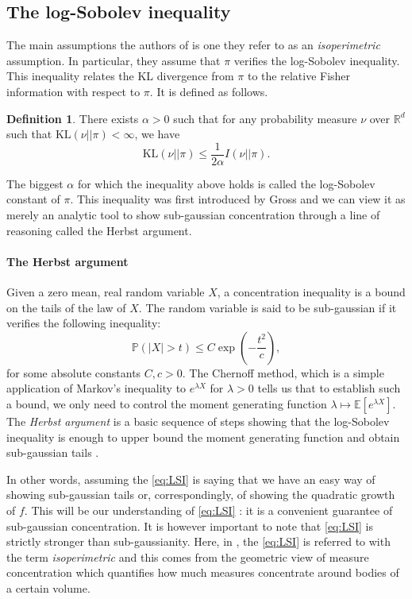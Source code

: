 \documentclass[10pt,journal,a4paper]{IEEEtran}
\theoremstyle{definition}
\newtheorem{definition}{Definition}[section]
\newcommand{\Prb}{\mathbb{P}}
\newcommand{\E}{\mathbb{E}}
\newcommand{\R}{\mathbb{R}}
\newcommand{\KL}{\text{KL}}
\begin{document}
\subsection{The log-Sobolev inequality}

The main assumptions the authors of \cite{vempala_rapid_2019} is one they refer to as an \textit{isoperimetric} assumption. In particular, they assume that $\pi$ verifies the log-Sobolev inequality. This inequality relates the KL divergence from $\pi$ to the relative Fisher information with respect to $\pi$. It is defined as follows.

\begin{definition}
  There exists $\alpha >0$ such that for any probability measure $\nu$ over $\R^d$ such that $\KL(\nu || \pi) < \infty$, we have
  \begin{equation}
  \KL(\nu || \pi) \leq \frac{1}{2\alpha} I(\nu || \pi).
  \label{eq:LSI}
  \tag{LSI}
  \end{equation}
\end{definition}

The biggest $\alpha$ for which the inequality above holds is called the log-Sobolev constant of $\pi$. This inequality was first introduced by Gross \cite{gross_logarithmic_1975} and we can view it as merely an analytic tool to show sub-gaussian concentration through a line of reasoning called the Herbst argument. 

\begin{boxK}
\paragraph*{The Herbst argument} Given a zero mean, real random variable $X$, a concentration inequality is a bound on the tails of the law of $X$. The random variable is said to be sub-gaussian if it verifies the following inequality:
\[
\Prb(|X| > t) \leq C\exp(-\frac{t^2}{c}),
\]
for some absolute constants $C, c > 0$. The Chernoff method, which is a simple application of Markov's inequality to $e^{\lambda X}$ for $\lambda >0$ tells us that to establish such a bound, we only need to control the moment generating function $\lambda \mapsto \E[e^{\lambda X}]$. The \textit{Herbst argument} is a basic sequence of steps showing that the log-Sobolev inequality is enough to upper bound the moment generating function and obtain sub-gaussian tails \cite{boucheron_concentration_2013, ane_sur_2000}.
\end{boxK} 

In other words, assuming the \eqref{eq:LSI} is saying that we have an easy way of showing sub-gaussian tails or, correspondingly, of showing the quadratic growth of $f$. This will be our understanding of \eqref{eq:LSI} : it is a convenient guarantee of sub-gaussian concentration. It is however important to note that \eqref{eq:LSI} is strictly stronger than sub-gaussianity. Here, in \cite{vempala_rapid_2019}, the \eqref{eq:LSI} is referred to with the term \textit{isoperimetric} and this comes from the geometric view of measure concentration which quantifies how much measures concentrate around bodies of a certain volume.
\end{document}
